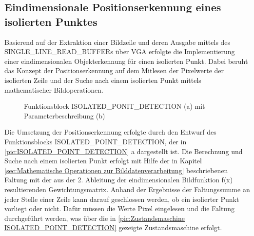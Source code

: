 \documentclass[ngerman,12pt]{article} %
\begin{document}
{\subsection{Eindimensionale Positionserkennung eines isolierten Punktes}
\label{sec:Eindimensionale Positionserkennung eines isolierten Punkts}
Basierend auf der Extraktion einer Bildzeile und deren Ausgabe mittels des SINGLE\_LINE\_READ\_BUFFERs über VGA erfolgte die Implementierung einer eindimensionalen Objekterkennung für einen isolierten Punkt. Dabei beruht das Konzept der Positionserkennung auf dem Mitlesen der Pixelwerte der isolierten Zeile und der Suche nach einem isolierten Punkt mittels mathematischer Bildoperationen.\newline

\begin{figure}[h!tb]
  \centering
  \qquad
  \caption[Funktionsblock ISOLATED\_PONIT\_DETECTION mit Parameterbeschreibung]{\label{pic:ISOLATED_POINT_DETECTION}Funktionsblock ISOLATED\_PONIT\_DETECTION (a) mit Parameterbeschreibung (b)}
\end{figure}

Die Umsetzung der Positionserkennung erfolgte durch den Entwurf des Funktionsblocks ISOLATED\_POINT\_DETECTION, der in \autoref{pic:ISOLATED_POINT_DETECTION} a dargestellt ist. Die Berechnung und Suche nach einem isolierten Punkt erfolgt mit Hilfe der in Kapitel \ref{sec:Mathematische Operationen zur Bilddatenverarbeitung} beschriebenen Faltung mit der aus der 2. Ableitung der eindimensionalen Bildfunktion f(x) resultierenden Gewichtungsmatrix. Anhand der Ergebnisse der Faltungssumme an jeder Stelle einer Zeile kann darauf geschlossen werden, ob ein isolierter Punkt vorliegt oder nicht. Dafür müssen die Werte Pixel eingelesen und die Faltung durchgeführt werden, was über die in \autoref{pic:Zustandsmaschine ISOLATED_POINT_DETECTION} gezeigte Zustandsmaschine erfolgt.\newline

}
\end{document}
